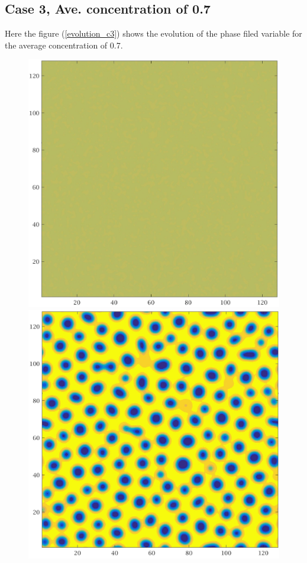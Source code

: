 \documentclass[a4paper,6pt]{article}
\begin{document}
\subsection{Case 3, Ave. concentration of 0.7}

Here the figure (\ref{evolution_c3}) shows the evolution of the phase filed variable for the average concentration of 0.7.
\begin{figure}[H]
        \begin{minipage}[b]{.32\linewidth}        
                \centering
                \includegraphics[width=1\textwidth]{pics/C3_t1.jpg}
        \end{minipage}
        \begin{minipage}[b]{.32\linewidth}
                \centering
                \includegraphics[width=1\textwidth]{pics/C3_t2.jpg}

\end{minipage}
\end{figure}
\end{document}
